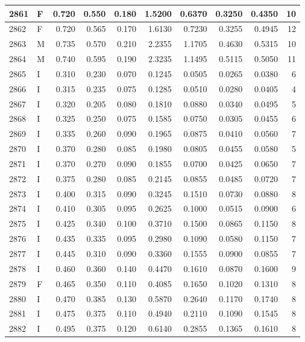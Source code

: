 \documentclass[9pt,twocolumn,twoside,]{pnas-new}
\begin{document}
\begin{tabular}{l|l|r|r|r|r|r|r|r|r}
\hline
2861 & F & 0.720 & 0.550 & 0.180 & 1.5200 & 0.6370 & 0.3250 & 0.4350 & 10\\
\hline
2862 & F & 0.720 & 0.565 & 0.170 & 1.6130 & 0.7230 & 0.3255 & 0.4945 & 12\\
\hline
2863 & M & 0.735 & 0.570 & 0.210 & 2.2355 & 1.1705 & 0.4630 & 0.5315 & 10\\
\hline
2864 & M & 0.740 & 0.595 & 0.190 & 2.3235 & 1.1495 & 0.5115 & 0.5050 & 11\\
\hline
2865 & I & 0.310 & 0.230 & 0.070 & 0.1245 & 0.0505 & 0.0265 & 0.0380 & 6\\
\hline
2866 & I & 0.315 & 0.235 & 0.075 & 0.1285 & 0.0510 & 0.0280 & 0.0405 & 4\\
\hline
2867 & I & 0.320 & 0.205 & 0.080 & 0.1810 & 0.0880 & 0.0340 & 0.0495 & 5\\
\hline
2868 & I & 0.325 & 0.250 & 0.075 & 0.1585 & 0.0750 & 0.0305 & 0.0455 & 6\\
\hline
2869 & I & 0.335 & 0.260 & 0.090 & 0.1965 & 0.0875 & 0.0410 & 0.0560 & 7\\
\hline
2870 & I & 0.370 & 0.280 & 0.085 & 0.1980 & 0.0805 & 0.0455 & 0.0580 & 5\\
\hline
2871 & I & 0.370 & 0.270 & 0.090 & 0.1855 & 0.0700 & 0.0425 & 0.0650 & 7\\
\hline
2872 & I & 0.375 & 0.280 & 0.085 & 0.2145 & 0.0855 & 0.0485 & 0.0720 & 7\\
\hline
2873 & I & 0.400 & 0.315 & 0.090 & 0.3245 & 0.1510 & 0.0730 & 0.0880 & 8\\
\hline
2874 & I & 0.410 & 0.305 & 0.095 & 0.2625 & 0.1000 & 0.0515 & 0.0900 & 6\\
\hline
2875 & I & 0.425 & 0.340 & 0.100 & 0.3710 & 0.1500 & 0.0865 & 0.1150 & 8\\
\hline
2876 & I & 0.435 & 0.335 & 0.095 & 0.2980 & 0.1090 & 0.0580 & 0.1150 & 7\\
\hline
2877 & I & 0.445 & 0.310 & 0.090 & 0.3360 & 0.1555 & 0.0900 & 0.0855 & 7\\
\hline
2878 & I & 0.460 & 0.360 & 0.140 & 0.4470 & 0.1610 & 0.0870 & 0.1600 & 9\\
\hline
2879 & F & 0.465 & 0.350 & 0.110 & 0.4085 & 0.1650 & 0.1020 & 0.1310 & 8\\
\hline
2880 & I & 0.470 & 0.385 & 0.130 & 0.5870 & 0.2640 & 0.1170 & 0.1740 & 8\\
\hline
2881 & I & 0.475 & 0.375 & 0.110 & 0.4940 & 0.2110 & 0.1090 & 0.1545 & 8\\
\hline
2882 & I & 0.495 & 0.375 & 0.120 & 0.6140 & 0.2855 & 0.1365 & 0.1610 & 8\\

\end{tabular}
\end{document}
